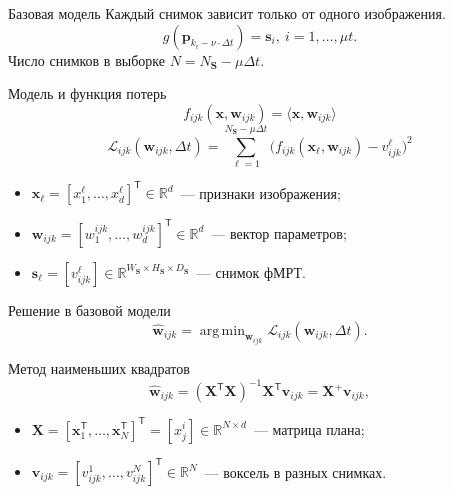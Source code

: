 \documentclass{beamer}
\newcommand{\T}{^{\mathsf{T}}}
\DeclareMathOperator*{\argmin}{arg\,min}  %
\begin{document}
\begin{frame}{Базовая модель}
    Каждый снимок зависит только от одного изображения.
	\begin{equation*}
		\label{eq5}
		g(\mathbf{p}_{k_i - \nu \cdot \Delta t}) = \mathbf{s}_i, \ i = 1, \ldots, \mu t.
	\end{equation*}
    Число снимков в выборке $N = N_{\mathbf{S}} - \mu \Delta t$.
    \begin{block}{Модель и функция потерь}
        \begin{equation*}
            \label{eq7}
            f_{ijk}(\mathbf{x}, \mathbf{w}_{ijk}) = \langle \mathbf{x}, \mathbf{w}_{ijk} \rangle
        \end{equation*}
        \begin{equation*}
            \label{eq8}
            \mathcal{L}_{ijk}(\mathbf{w}_{ijk}, \Delta t) = \sum\limits_{\ell = 1}^{N_{\mathbf{S}} - \mu \Delta t} \big(f_{ijk}(\mathbf{x}_{\ell}, \mathbf{w}_{ijk}) - v^{\ell}_{ijk}\big)^2
        \end{equation*}
        \begin{itemize}
            \item $\mathbf{x}_{\ell} = [x^{\ell}_1, \ldots, x^{\ell}_{d}]\T \in \mathbb{R}^{d}$~--- признаки изображения;
            \item $\mathbf{w}_{ijk} = [w^{ijk}_1, \ldots, w^{ijk}_{d}]\T \in \mathbb{R}^{d}$~--- вектор параметров;
            \item $\mathbf{s}_{\ell} = [v^{\ell}_{ijk}] \in \mathbb{R}^{W_{\mathbf{S}} \times H_{\mathbf{S}} \times D_{\mathbf{S}}}$~--- снимок фМРТ.
        \end{itemize}
    \end{block}
\end{frame}
\begin{frame}{Решение в базовой модели}
    \begin{equation*}
		\label{eq9}
		\hat{\mathbf{w}}_{ijk} = \argmin_{\mathbf{w}_{ijk}} \mathcal{L}_{ijk}(\mathbf{w}_{ijk}, \Delta t).
	\end{equation*}

    \begin{block}{Метод наименьших квадратов}
        \begin{equation*}
            \label{eq12}
            \hat{\mathbf{w}}_{ijk} = (\mathbf{X}\T \mathbf{X})^{-1} \mathbf{X}\T \mathbf{v}_{ijk} = \mathbf{X}^{+} \mathbf{v}_{ijk},
	    \end{equation*}
        \begin{itemize}
            \item $\mathbf{X} = [\mathbf{x}_1\T, \ldots, \mathbf{x}_N\T]\T = [x^i_j] \in \mathbb{R}^{N \times d}$~--- матрица плана;
            \item $\mathbf{v}_{ijk} = [v^1_{ijk}, \ldots, v^N_{ijk}]\T \in \mathbb{R}^N$~--- воксель в разных снимках.
        \end{itemize}
    \end{block}
\end{frame}
\end{document}
